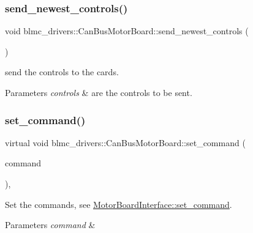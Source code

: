 \subsubsection{\texorpdfstring{send\+\_\+newest\+\_\+controls()}{send\_newest\_controls()}}
{\footnotesize\ttfamily void blmc\+\_\+drivers\+::\+Can\+Bus\+Motor\+Board\+::send\+\_\+newest\+\_\+controls (\begin{DoxyParamCaption}{ }\end{DoxyParamCaption})\hspace{0.3cm}{\ttfamily [private]}}



send the controls to the cards. 


\begin{DoxyParams}{Parameters}
{\em controls} & are the controls to be sent. \\
\hline
\end{DoxyParams}
\mbox{\label{classblmc__drivers_1_1CanBusMotorBoard_a4bb9c1f7f59507feed145111ccffc625}} 
\subsubsection{\texorpdfstring{set\+\_\+command()}{set\_command()}}
{\footnotesize\ttfamily virtual void blmc\+\_\+drivers\+::\+Can\+Bus\+Motor\+Board\+::set\+\_\+command (\begin{DoxyParamCaption}\item[{const \hyperlink{classblmc__drivers_1_1MotorBoardCommand}{Motor\+Board\+Command} \&}]{command }\end{DoxyParamCaption})\hspace{0.3cm}{\ttfamily [inline]}, {\ttfamily [virtual]}}



Set the commands, see \hyperlink{classblmc__drivers_1_1MotorBoardInterface_a86b4ff810ca652d6761090ceaff65621}{Motor\+Board\+Interface\+::set\+\_\+command}. 


\begin{DoxyParams}{Parameters}
{\em command} & \\
\hline
\end{DoxyParams}



